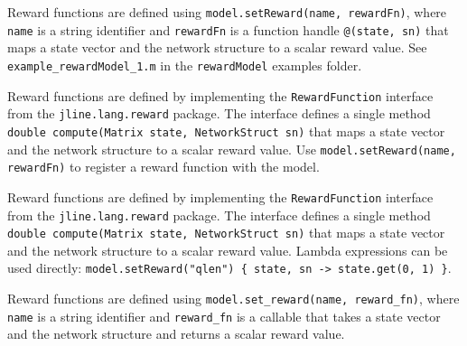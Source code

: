 \begin{MATLAB}
Reward functions are defined using \texttt{model.setReward(name, rewardFn)}, where \texttt{name} is a string identifier and \texttt{rewardFn} is a function handle \texttt{@(state, sn)} that maps a state vector and the network structure to a scalar reward value. See \texttt{example\_rewardModel\_1.m} in the \texttt{rewardModel} examples folder.
\end{MATLAB}
\begin{JAVA}
Reward functions are defined by implementing the \texttt{RewardFunction} interface from the \texttt{jline.lang.reward} package. The interface defines a single method \texttt{double compute(Matrix state, NetworkStruct sn)} that maps a state vector and the network structure to a scalar reward value. Use \texttt{model.setReward(name, rewardFn)} to register a reward function with the model.
\end{JAVA}
\begin{KOTLIN}
Reward functions are defined by implementing the \texttt{RewardFunction} interface from the \texttt{jline.lang.reward} package. The interface defines a single method \texttt{double compute(Matrix state, NetworkStruct sn)} that maps a state vector and the network structure to a scalar reward value. Lambda expressions can be used directly: \texttt{model.setReward("qlen") \{ state, sn -> state.get(0, 1) \}}.
\end{KOTLIN}
\begin{PYTHON}
Reward functions are defined using \texttt{model.set\_reward(name, reward\_fn)}, where \texttt{name} is a string identifier and \texttt{reward\_fn} is a callable that takes a state vector and the network structure and returns a scalar reward value.
\end{PYTHON}

